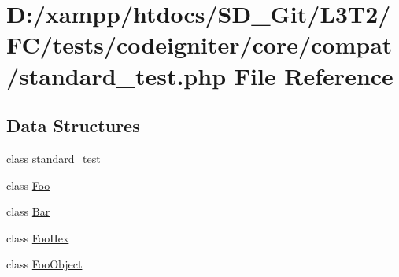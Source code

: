 \hypertarget{standard__test_8php}{}\section{D\+:/xampp/htdocs/\+S\+D\+\_\+\+Git/\+L3\+T2/\+F\+C/tests/codeigniter/core/compat/standard\+\_\+test.php File Reference}
\label{standard__test_8php}
\subsection*{Data Structures}
\begin{DoxyCompactItemize}
\item 
class \hyperlink{classstandard__test}{standard\+\_\+test}
\item 
class \hyperlink{class_foo}{Foo}
\item 
class \hyperlink{class_bar}{Bar}
\item 
class \hyperlink{class_foo_hex}{Foo\+Hex}
\item 
class \hyperlink{class_foo_object}{Foo\+Object}
\end{DoxyCompactItemize}
